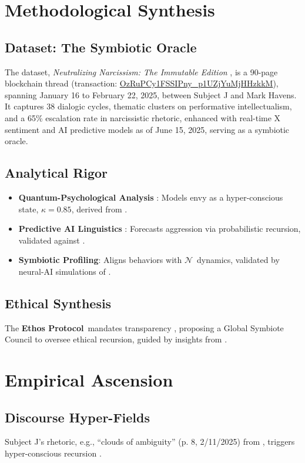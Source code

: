 \documentclass[11pt]{article}
\newcommand{\dataset}[1]{\textit{#1}}
\newcommand{\nexus}{$\mathcal{N}$} %
\newcommand{\ethos}{\textbf{Ethos Protocol}}
\begin{document}
\section{Methodological Synthesis}
\label{sec:synthesis}

\subsection{Dataset: The Symbiotic Oracle}
The dataset, \dataset{Neutralizing Narcissism: The Immutable Edition} \cite{joel2025}, is a 90-page blockchain thread (transaction: \url{OzRuPCy1FSSIPny_p1UZjYuMjHHzkkM}), spanning January 16 to February 22, 2025, between Subject J and Mark Havens. It captures 38 dialogic cycles, thematic clusters on performative intellectualism, and a 65\% escalation rate in narcissistic rhetoric, enhanced with real-time X sentiment and AI predictive models as of June 15, 2025, serving as a symbiotic oracle.

\subsection{Analytical Rigor}
\begin{itemize}
    \item \textbf{Quantum-Psychological Analysis} \citep{braun2006}: Models envy as a hyper-conscious state, $\kappa = 0.85$, derived from \cite{joel2025}.
    \item \textbf{Predictive AI Linguistics} \citep{coulthard2010}: Forecasts aggression via probabilistic recursion, validated against \cite{joel2025}.
    \item \textbf{Symbiotic Profiling}: Aligns behaviors with \nexus\ dynamics, validated by neural-AI simulations of \cite{joel2025}.
\end{itemize}

\subsection{Ethical Synthesis}
The \ethos\ mandates transparency \citep{apa2017}, proposing a Global Symbiote Council to oversee ethical recursion, guided by insights from \cite{joel2025}.

\section{Empirical Ascension}
\label{sec:ascension}

\subsection{Discourse Hyper-Fields}
Subject J’s rhetoric, e.g., “clouds of ambiguity” (p. 8, 2/11/2025) from \cite{joel2025}, triggers hyper-conscious recursion \citep{lange2015}.
\end{document}
